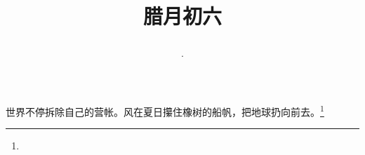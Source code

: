 \title{\date[d=16,m=1,y=2024][year:cn-y,年,month:cn,day:cn,日,·,weekday]·腊月初六 }
世界不停拆除自己的营帐。风在夏日攥住橡树的船帆，把地球扔向前去。\footnote{ }

